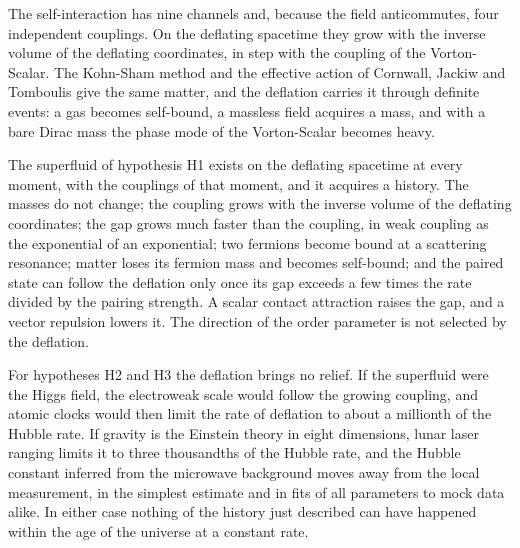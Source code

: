 The self-interaction has nine channels and, because the field anticommutes, four independent
couplings. On the deflating spacetime they grow with the inverse volume of the deflating
coordinates, in step with the coupling of the Vorton-Scalar. The Kohn-Sham method and the effective
action of Cornwall, Jackiw and Tomboulis give the same matter, and the deflation carries it through
definite events: a gas becomes self-bound, a massless field acquires a mass, and with a bare Dirac
mass the phase mode of the Vorton-Scalar becomes heavy.

The superfluid of hypothesis H1 exists on the deflating spacetime at every moment, with the
couplings of that moment, and it acquires a history. The masses do not change; the coupling grows
with the inverse volume of the deflating coordinates; the gap grows much faster than the coupling,
in weak coupling as the exponential of an exponential; two fermions become bound at a scattering
resonance; matter loses its fermion mass and
becomes self-bound; and the paired state can follow the deflation only once its gap exceeds a few
times the rate divided by the pairing strength. A scalar contact attraction raises the gap, and a
vector repulsion lowers it. The direction of the order parameter is not selected
by the deflation.

For hypotheses H2 and H3 the deflation brings no relief. 
If the superfluid were the Higgs field, the electroweak scale would follow the growing coupling, and
atomic clocks would then limit the rate of deflation to about a millionth of the Hubble rate. If
gravity is the Einstein theory in eight dimensions, lunar laser ranging limits it to three
thousandths of the Hubble rate, and the Hubble constant inferred from the microwave background
moves away from the local measurement, in the simplest estimate and in fits of all parameters to
mock data alike. In either case nothing of the history just described can have happened within the
age of the universe at a constant rate.

